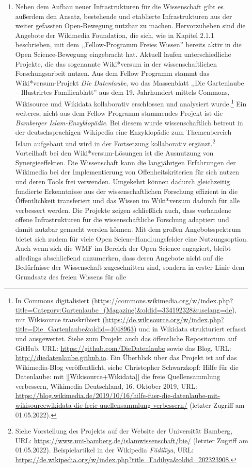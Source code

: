 \begin{enumerate}
\item Neben dem Aufbau neuer Infrastrukturen für die Wissenschaft gibt es außerdem den Ansatz, bestehende und etablierte Infrastrukturen aus der weiter gefassten Open-Bewegung nutzbar zu machen. Hervorzuheben sind die Angebote der Wikimedia Foundation, die sich, wie in Kapitel 2.1.1 beschrieben, mit dem ,,Fellow-Programm Freies Wissen'' bereits aktiv in die Open Science-Bewegung eingebracht hat. Aktuell laufen unterschiedliche Projekte, die das sogenannte Wiki*versum in der wissenschaftlichen Forschungsarbeit nutzen. Aus dem Fellow Programm stammt das Wiki*versum-Projekt \textit{Die Datenlaube}, wo das Massenblatt ,,Die Gartenlaube – Illustrirtes Familienblatt'' aus dem 19. Jahrhundert mittels Commons, Wikisource und Wikidata kollaborativ erschlossen und analysiert wurde.\footnote{In Commons digitalisiert (\url{https://commons.wikimedia.org/w/index.php?title=Category:Gartenlaube_(Magazine)&oldid=334192328&uselang=de}), mit Wikisource transkribiert (\url{https://de.wikisource.org/w/index.php?title=Die_Gartenlaube&oldid=4048963}) und in Wikidata strukturiert erfasst und ausgewertet. Siehe zum Projekt auch das öffentliche Repositorium auf GitHub, URL: \url{https://github.com/DieDatenlaube} sowie das Blog, URL: \url{http://diedatenlaube.github.io}. Ein Überblick über das Projekt ist auf das Wikimedia-Blog veröffentlicht, siehe Christopher Schwarzkopf: Hilfe für die Datenlaube: mit [[Wikisource+Wikidata]] die freie Quellensammlung verbessern, Wikimedia Deutschland, 16. Oktober 2019, URL: \url{https://blog.wikimedia.de/2019/10/16/hilfe-fuer-die-datenlaube-mit-wikisourcewikidata-die-freie-quellensammlung-verbessern/} (letzter Zugriff am 01.05.2022).} Ein weiteres, nicht aus dem Fellow Programm stammendes Projekt ist die \textit{Bamberger Islam-Enzyklopädie}. Bei diesem wurde wissenschaftlich betreut in der deutschsprachigen Wikipedia eine Enzyklopädie zum Themenbereich Islam aufgebaut und wird in der Fortsetzung kollaborativ ergänzt.\footnote{Siehe Vorstellung des Projekts auf der Website der Universität Bamberg, URL: \url{https://www.uni-bamberg.de/islamwissenschaft/bie/} (letzter Zugriff am 01.05.2022). Beispielartikel in der Wikipedia \textit{Fādilīya}, URL: \url{https://de.wikipedia.org/w/index.php?title=Fādilīya&oldid=202323908.}} Vorteilhaft bei den Wiki*versum-Lösungen ist die Ausnutzung von Synergieeffekten. Die Wissenschaft kann die langjährigen Erfahrungen der Wikimedia bei der Implementierung von Offenheitskriterien für sich nutzen und deren Tools frei verwenden. Umgekehrt können dadurch gleichzeitig fundierte Erkenntnisse aus der wissenschaftlichen Forschung effizient in die Öffentlichkeit transferiert und das Wissen im Wiki*versum dadurch für alle verbessert werden. Die Projekte zeigen schließlich auch, dass vorhandene offene Infrastrukturen für die wissenschaftliche Forschung adaptiert und damit nutzbar gemacht werden können. Mit dem großen Angebotsspektrum bietet sich zudem für viele Open Sciene-Handlungsfelder eine Nutzungsoption. Auch wenn sich die WMF im Bereich der Open Science engagiert, bleibt alledings abschließend anzumerken, dass deren Angebote nicht auf die Bedürfnisse der Wissenschaft zugeschnitten sind, sondern in erster Linie dem Grundsatz des freien Wissens für alle 
\end{enumerate}
